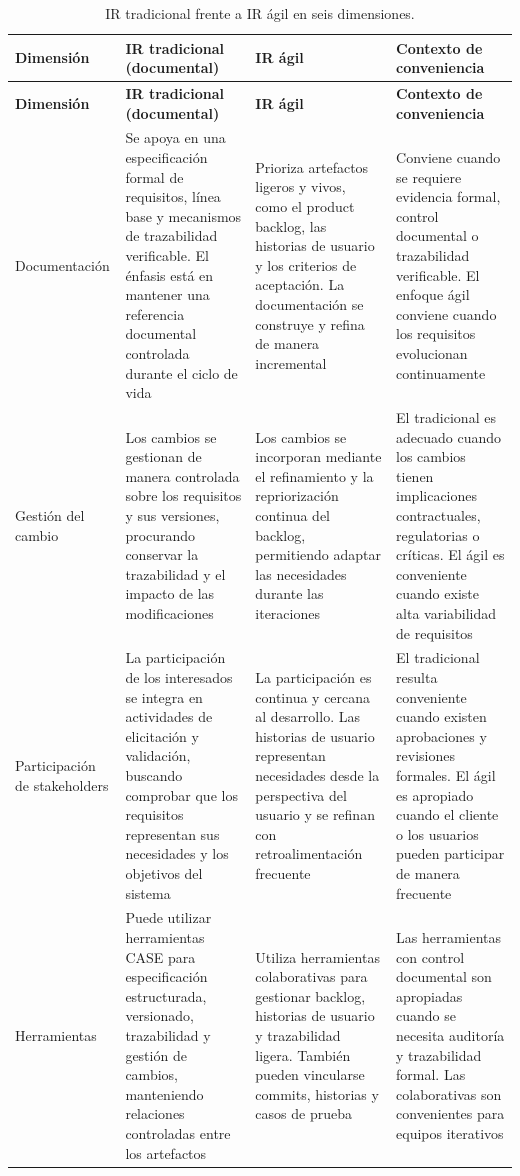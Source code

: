\documentclass[journal,onecolumn]{IEEEtran}
\begin{document}
	\begin{longtable}{@{}p{2.1cm} p{3.5cm} p{3.5cm} p{3.5cm}@{}}
		\caption{IR tradicional frente a IR ágil en seis dimensiones.}
		\label{tab:ir-tradicional-agil} \\
		\toprule
		\textbf{Dimensión} & \textbf{IR tradicional (documental)} & \textbf{IR ágil} & \textbf{Contexto de conveniencia} \\
		\midrule
		\endfirsthead
		\toprule
		\textbf{Dimensión} & \textbf{IR tradicional (documental)} & \textbf{IR ágil} & \textbf{Contexto de conveniencia} \\
		\midrule
		\endhead
		Documentación & Se apoya en una especificación formal de requisitos, línea base y mecanismos de trazabilidad verificable. El énfasis está en mantener una referencia documental controlada durante el ciclo de vida \cite{ISO29148-2018} & Prioriza artefactos ligeros y vivos, como el product backlog, las historias de usuario y los criterios de aceptación. La documentación se construye y refina de manera incremental \cite{Tomaselli2025} & Conviene cuando se requiere evidencia formal, control documental o trazabilidad verificable. El enfoque ágil conviene cuando los requisitos evolucionan continuamente \\
		Gestión del cambio & Los cambios se gestionan de manera controlada sobre los requisitos y sus versiones, procurando conservar la trazabilidad y el impacto de las modificaciones \cite{ISO29148-2018} & Los cambios se incorporan mediante el refinamiento y la repriorización continua del backlog, permitiendo adaptar las necesidades durante las iteraciones \cite{Tomaselli2025} & El tradicional es adecuado cuando los cambios tienen implicaciones contractuales, regulatorias o críticas. El ágil es conveniente cuando existe alta variabilidad de requisitos \\
		Participación de stakeholders & La participación de los interesados se integra en actividades de elicitación y validación, buscando comprobar que los requisitos representan sus necesidades y los objetivos del sistema \cite{ISO29148-2018} & La participación es continua y cercana al desarrollo. Las historias de usuario representan necesidades desde la perspectiva del usuario y se refinan con retroalimentación frecuente \cite{Tomaselli2025} & El tradicional resulta conveniente cuando existen aprobaciones y revisiones formales. El ágil es apropiado cuando el cliente o los usuarios pueden participar de manera frecuente \\
		Herramientas & Puede utilizar herramientas CASE para especificación estructurada, versionado, trazabilidad y gestión de cambios, manteniendo relaciones controladas entre los artefactos \cite{ISO29148-2018} & Utiliza herramientas colaborativas para gestionar backlog, historias de usuario y trazabilidad ligera. También pueden vincularse commits, historias y casos de prueba \cite{Tomaselli2025} & Las herramientas con control documental son apropiadas cuando se necesita auditoría y trazabilidad formal. Las colaborativas son convenientes para equipos iterativos \\

\end{longtable}
\end{document}
